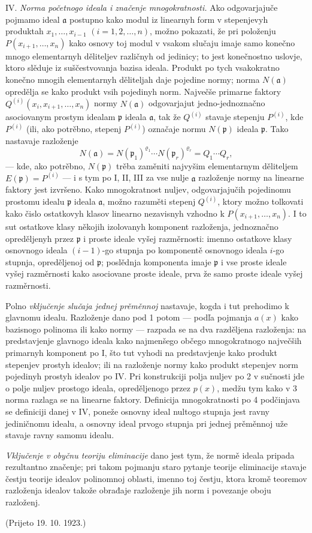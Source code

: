 \documentclass[11pt]{article}
\providecommand{\fraka}{\mathfrak a}
\providecommand{\frakp}{\mathfrak p}
\begin{document}
\noindent IV. \emph{Norma početnogo ideala i značenje mnogokratnosti.} Ako odgovarjajuče pojmamo ideal $\fraka$ postupno kako modul iz linearnyh form v stepenjevyh produktah $x_1,\ldots,x_{i-1}$ $(i=1,2,\ldots,n)$, možno pokazati, že pri položenju $P(x_{i+1},\ldots,x_n)$ kako osnovy toj modul v vsakom slučaju imaje samo konečno mnogo elementarnyh děliteljev različnyh od jedinicy; to jest konečnostno uslovje, ktoro slěduje iz suščestvovanja bazisa ideala. Produkt po tych vsakokratno konečno mnogih elementarnyh děliteljah daje pojedine normy; norma $N(\fraka)$ opredělja se kako produkt vsih pojedinyh norm. Največše primarne faktory $Q^{(i)}(x_i,x_{i+1},\ldots,x_n)$ normy $N(\fraka)$ odgovarjajut jedno-jednoznačno asociovanym prostym idealam $\frakp$ ideala $\fraka$, tak že $Q^{(i)}$ stavaje stepenju $P^{(i)}$, kde $P^{(i)}$ (ili, ako potrěbno, stepenj $P^{(i)}$) označaje normu $N(\frakp)$ ideala $\frakp$. Tako nastavaje razloženje
\[
 N(\fraka)=N(\frakp_1)^{\varrho_1}\cdots N(\frakp_r)^{\varrho_r}=Q_1\cdots Q_r,
\]
--- kde, ako potrěbno, $N(\frakp)$ trěba zaměniti najvyšim elementarnym děliteljem $E(\frakp)=P^{(i)}$ --- i s tym po I, II, III za vse nulje $\fraka$ razloženje normy na linearne faktory jest izvršeno. Kako mnogokratnost nuljev, odgovarjajučih pojedinomu prostomu idealu $\frakp$ ideala $\fraka$, možno razuměti stepenj $Q^{(i)}$, ktory možno tolkovati kako čislo ostatkovyh klasov linearno nezavisnyh vzhodno k $P(x_{i+1},\ldots,x_n)$. I to sut ostatkove klasy někojih izolovanyh komponent razloženja, jednoznačno opreděljenyh przez $\frakp$ i proste ideale vyšej razměrnosti: imenno ostatkove klasy osnovnogo ideala $(i-1)$-go stupnja po komponentě osnovnogo ideala $i$-go stupnja, opreděljenoj od $\frakp$; poslědnja komponenta imaje $\frakp$ i vse proste ideale vyšej razměrnosti kako asociovane proste ideale, prva že samo proste ideale vyšej razměrnosti.

Polno \emph{vključenje slučaja jednej prěměnnoj} nastavaje, kogda i tut prehodimo k glavnomu idealu. Razloženje dano pod 1 potom --- podľa pojmanja $a(x)$ kako bazisnogo polinoma ili kako normy --- razpada se na dva razděljena razloženja: na predstavjenje glavnogo ideala kako najmenšego občego mnogokratnogo največših primarnyh komponent po I, što tut vyhodi na predstavjenje kako produkt stepenjev prostyh idealov; ili na razloženje normy kako produkt stepenjev norm pojedinyh prostyh idealov po IV. Pri konstrukciji polja nuljev po 2 v sučnosti jde o polje nuljev prostogo ideala, opreděljenogo przez $p(x)$, medžu tym kako v 3 norma razlaga se na linearne faktory. Definicija mnogokratnosti po 4 podčinjava se definiciji danej v IV, poneže osnovny ideal nultogo stupnja jest ravny jediničnomu idealu, a osnovny ideal prvogo stupnja pri jednej prěměnnoj uže stavaje ravny samomu idealu.

\emph{Vključenje v obyčnu teoriju eliminacije} dano jest tym, že normě ideala pripada rezultantno značenje; pri takom pojmanju staro pytanje teorije eliminacije stavaje čestju teorije idealov polinomnoj oblasti, imenno toj čestju, ktora kromě teoremov razloženja idealov takože obrađaje razloženje jih norm i povezanje oboju razloženj.

\begin{center}
(Prijeto 19. 10. 1923.)
\end{center}
\end{document}
